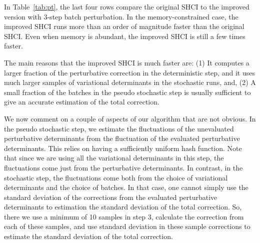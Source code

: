 \documentclass[%
reprint,
 superscriptaddress,
 amsmath,amssymb,
 aps,
]{revtex4-1}
\begin{document}

In Table~\ref{tab:pt}, the last four rows compare the original SHCI to the improved version with 3-step batch perturbation.
In the memory-constrained case, the improved SHCI runs more than an order of magnitude faster than the original SHCI.
Even when memory is abundant, the improved SHCI is still a few times faster.

The main reasons that the improved SHCI is much faster are:
(1) It computes a larger fraction of the perturbative correction in the deterministic step, and it uses much larger samples
of variational determinants in the stochastic runs,
and,
(2) A small fraction of the batches in the pseudo stochastic step is usually sufficient to give an accurate estimation of the total correction.

We now comment on a couple of aspects of our algorithm that are not obvious.
In the pseudo stochastic step, we estimate the fluctuations of the unevaluated perturbative determinants from the fluctuation of the evaluated perturbative determinants.
This relies on having a sufficiently uniform hash function.
Note that since we are using all the variational determinants in this step,
the fluctuations come just from the perturbative determinants.
In contrast, in the stochastic step, the fluctuations come both from the choice of variational determinants and the choice of batches.
In that case, one cannot simply use the standard deviation of the corrections from the evaluated perturbative determinants to estimation the standard deviation of the total correction.
So, there we use a minimum of 10 samples in step 3, calculate the correction from each of these samples, and use standard deviation in these sample corrections to estimate the standard deviation of the total correction.
\end{document}

